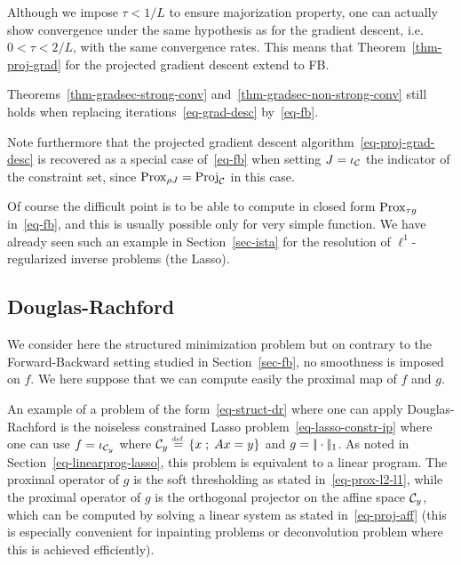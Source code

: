 Although we impose $\tau<1/L$ to ensure majorization property, one can actually show convergence under the same hypothesis as for the gradient descent, i.e. $0 < \tau < 2/L$, with the same convergence rates.  This means that Theorem~\ref{thm-proj-grad} for the projected gradient descent extend to FB. 

\begin{thm}\label{thm-fb-conv}
	Theorems~\ref{thm-gradsec-strong-conv} and~\ref{thm-gradsec-non-strong-conv} still holds when replacing iterations~\eqref{eq-grad-desc} by~\eqref{eq-fb}.
\end{thm}

Note furthermore that the projected gradient descent algorithm~\eqref{eq-proj-grad-desc} is recovered as a special case of~\eqref{eq-fb} when setting $J=\iota_{\mathcal{C}}$ the indicator of the constraint set, since $\operatorname{Prox}_{\rho J} = \operatorname{Proj}_{\mathcal{C}}$ in this case.

Of course the difficult point is to be able to compute in closed form $\operatorname{Prox}_{\tau g}$ in~\eqref{eq-fb}, and this is usually possible only for very simple function. We have already seen such an example in Section~\ref{sec-ista} for the resolution of $\ell^1$-regularized inverse problems (the Lasso).


\subsection{Douglas-Rachford}
\label{sec-dr}

We consider here the structured minimization problem
but on contrary to the Forward-Backward setting studied in Section~\ref{sec-fb}, no smoothness is imposed on $f$. We here suppose that we can compute easily the proximal map of $f$ and $g$.

\begin{exmp}
An example of a problem of the form~\eqref{eq-struct-dr} where one can apply Douglas-Rachford is the noiseless constrained Lasso problem~\eqref{eq-lasso-constr-ip}
where one can use $f=\iota_{\mathcal{C}_y}$ where $\mathcal{C}_y \stackrel{\mbox{\upshape\tiny def.}}{=} \left\{ x \;;\; Ax=y \right\}$ and $g=|\!| \cdot |\!|_1$.
%
As noted in Section~\ref{eq-linearprog-lasso}, this problem is equivalent to a linear program.
%
The proximal operator of $g$ is the soft thresholding as stated in~\eqref{eq-prox-l2-l1}, while the proximal operator of $g$ is the orthogonal projector on the affine space $\mathcal{C}_y$, which can be computed by solving a linear system as stated in~\eqref{eq-proj-aff} (this is especially convenient for inpainting problems or deconvolution problem where this is achieved efficiently).
\end{exmp}

